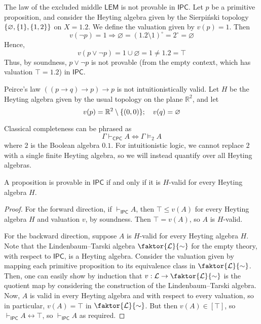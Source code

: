 \begin{example}
    The law of the excluded middle \( \mathsf{LEM} \) is not provable in \( \mathsf{IPC} \).
    Let \( p \) be a primitive proposition, and consider the Heyting algebra given by the Sierpi\'nski topology \( \qty{\varnothing, \qty{1}, \qty{1, 2}} \) on \( X = \qty{1,2} \).
    We define the valuation given by \( v(p) = \qty{1} \).
    Then
    \[ v(\neg p) = \qty{1} \Rightarrow \varnothing = (\qty{1, 2} \setminus \qty{1})^\circ = \qty{2}^\circ = \varnothing \]
    Hence,
    \[ v(p \vee \neg p) = \qty{1} \cup \varnothing = \qty{1} \neq \qty{1, 2} = \top \]
    Thus, by soundness, \( p \vee \neg p \) is not provable (from the empty context, which has valuation \( \top = \qty{1, 2} \)) in \( \mathsf{IPC} \).
\end{example}
\begin{example}
    Peirce's law \( ((p \to q) \to p) \to p \) is not intuitionistically valid.
    Let \( H \) be the Heyting algebra given by the usual topology on the plane \( \mathbb R^2 \), and let
    \[ v(p) = \mathbb R^2 \setminus \qty{(0, 0)};\quad v(q) = \varnothing \]
\end{example}
Classical completeness can be phrased as
\[ \Gamma \vdash_{\mathsf{CPC}} A \iff \Gamma \vDash_2 A \]
where \( 2 \) is the Boolean algebra \( \qty{0, 1} \).
For intuitionistic logic, we cannot replace \( 2 \) with a single finite Heyting algebra, so we will instead quantify over all Heyting algebras.
\begin{theorem}[completeness]
    A proposition is provable in \( \mathsf{IPC} \) if and only if it is \( H \)-valid for every Heyting algebra \( H \).
\end{theorem}
\begin{proof}
    For the forward direction, if \( \vdash_{\mathsf{IPC}} A \), then \( \top \leq v(A) \) for every Heyting algebra \( H \) and valuation \( v \), by soundness.
    Then \( \top = v(A) \), so \( A \) is \( H \)-valid.

    For the backward direction, suppose \( A \) is \( H \)-valid for every Heyting algebra \( H \).
    Note that the Lindenbaum--Tarski algebra \( \faktor{\mathcal L}{\sim} \) for the empty theory, with respect to \( \mathsf{IPC} \), is a Heyting algebra.
    Consider the valuation given by mapping each primitive proposition to its equivalence class in \( \faktor{\mathcal L}{\sim} \).
    Then, one can easily show by induction that \( v : \mathcal L \to \faktor{\mathcal L}{\sim} \) is the quotient map by considering the construction of the Lindenbaum--Tarski algebra.
    Now, \( A \) is valid in every Heyting algebra and with respect to every valuation, so in particular, \( v(A) = \top \) in \( \faktor{\mathcal L}{\sim} \).
    But then \( v(A) \in [\top] \), so \( \vdash_{\mathsf{IPC}} A \leftrightarrow \top \), so \( \vdash_{\mathsf{IPC}} A \) as required.
\end{proof}

